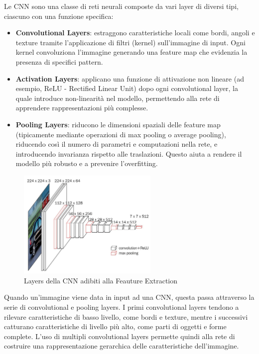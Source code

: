 Le CNN sono una classe di reti neurali composte da vari layer di diversi tipi, ciascuno con una funzione specifica:
\begin{itemize}
  \item \textbf{Convolutional Layers}: estraggono caratteristiche locali come bordi, angoli e texture tramite l'applicazione di filtri (kernel) sull'immagine di input. Ogni kernel convoluziona l'immagine generando una feature map che evidenzia la presenza di specifici pattern.
  \item \textbf{Activation Layers}: applicano una funzione di attivazione non lineare (ad esempio, ReLU - Rectified Linear Unit) dopo ogni convolutional layer, la quale introduce non-linearità nel modello, permettendo alla rete di apprendere rappresentazioni più complesse.
  \item \textbf{Pooling Layers}: riducono le dimensioni spaziali delle feature map (tipicamente mediante operazioni di max pooling o average pooling), riducendo così il numero di parametri e computazioni nella rete, e introducendo invarianza rispetto alle traslazioni. Questo aiuta a rendere il modello più robusto e a prevenire l'overfitting.
\end{itemize}

\begin{figure}[ht]
    \centering
    \includegraphics[width=0.6\textwidth]{files/capitoli/1-object-detection/assets/feature-extraction-layers.jpg}
    \caption{\label{fig:feature-extraction-layers}Layers della CNN adibiti alla Feauture Extraction\cite{3}}
\end{figure}

Quando un'immagine viene data in input ad una CNN, questa passa attraverso la serie di convolutional e pooling layers. I primi convolutional layers tendono a rilevare caratteristiche di basso livello, come bordi e texture, mentre i successivi catturano caratteristiche di livello più alto, come parti di oggetti e forme complete. L'uso di multipli convolutional layers permette quindi alla rete di costruire una rappresentazione gerarchica delle caratteristiche dell'immagine.

